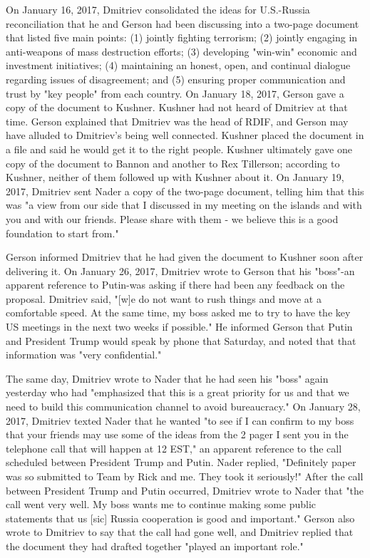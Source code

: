 On January 16, 2017, Dmitriev consolidated the ideas for U.S.-Russia reconciliation that he and Gerson had been discussing into a two-page document that listed five main points:
(1) jointly fighting terrorism;
(2) jointly engaging in anti-weapons of mass destruction efforts;
(3) developing "win-win" economic and investment initiatives;
(4) maintaining an honest, open, and continual dialogue regarding issues of disagreement; and
(5) ensuring proper communication and trust by "key people" from each country.%
On January 18, 2017, Gerson gave a copy of the document to Kushner.%
Kushner had not heard of Dmitriev at that time.%
Gerson explained that Dmitriev was the head of RDIF, and Gerson may have alluded to Dmitriev's being well connected.%
Kushner placed the document in a file and said he would get it to the right people.%
Kushner ultimately gave one copy of the document to Bannon and another to Rex Tillerson; according to Kushner, neither of them followed up with Kushner about it.%
On January 19, 2017, Dmitriev sent Nader a copy of the two-page document, telling him that this was "a view from our side that I discussed in my meeting on the islands and with you and with our friends.
Please share with them - we believe this is a good foundation to start from."%

Gerson informed Dmitriev that he had given the document to Kushner soon after delivering it.%
On January 26, 2017, Dmitriev wrote to Gerson that his "boss"-an apparent reference to Putin-was asking if there had been any feedback on the proposal.%
Dmitriev said, "[w]e do not want to rush things and move at a comfortable speed.
At the same time, my boss asked me to try to have the key US meetings in the next two weeks if possible."%
He informed Gerson that Putin and President Trump would speak by phone that Saturday, and noted that that information was "very confidential."%

The same day, Dmitriev wrote to Nader that he had seen his "boss" again yesterday who had "emphasized that this is a great priority for us and that we need to build this communication channel to avoid bureaucracy."%
On January 28, 2017, Dmitriev texted Nader that he wanted "to see if I can confirm to my boss that your friends may use some of the ideas from the 2 pager I sent you in the telephone call that will happen at 12 EST,"%
an apparent reference to the call scheduled between President Trump and Putin.
Nader replied, "Definitely paper was so submitted to Team by Rick and me.
They took it seriously!"%
After the call between President Trump and Putin occurred, Dmitriev wrote to Nader that "the call went very well.
My boss wants me to continue making some public statements that us [sic] Russia cooperation is good and important."%
Gerson also wrote to Dmitriev to say that the call had gone well, and Dmitriev replied that the document they had drafted together "played an important role."%

